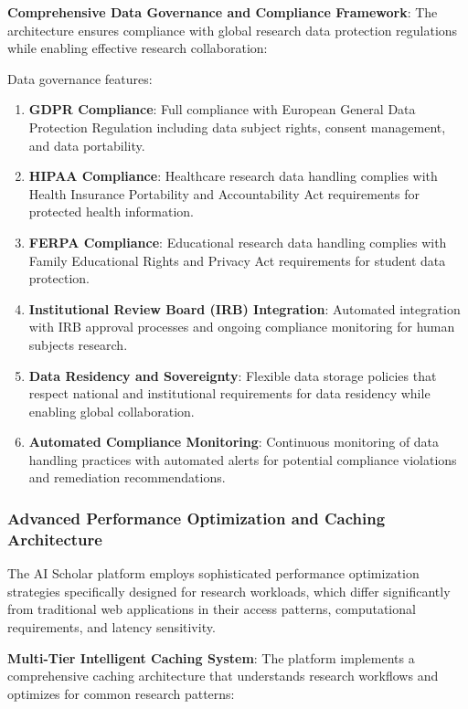 \documentclass[10pt,twocolumn]{article}
\begin{document}
\textbf{Comprehensive Data Governance and Compliance Framework}: The architecture ensures compliance with global research data protection regulations while enabling effective research collaboration:

Data governance features:
\begin{enumerate}
    \item \textbf{GDPR Compliance}: Full compliance with European General Data Protection Regulation including data subject rights, consent management, and data portability.
    
    \item \textbf{HIPAA Compliance}: Healthcare research data handling complies with Health Insurance Portability and Accountability Act requirements for protected health information.
    
    \item \textbf{FERPA Compliance}: Educational research data handling complies with Family Educational Rights and Privacy Act requirements for student data protection.
    
    \item \textbf{Institutional Review Board (IRB) Integration}: Automated integration with IRB approval processes and ongoing compliance monitoring for human subjects research.
    
    \item \textbf{Data Residency and Sovereignty}: Flexible data storage policies that respect national and institutional requirements for data residency while enabling global collaboration.
    
    \item \textbf{Automated Compliance Monitoring}: Continuous monitoring of data handling practices with automated alerts for potential compliance violations and remediation recommendations.
\end{enumerate}

\subsubsection{Advanced Performance Optimization and Caching Architecture}

The AI Scholar platform employs sophisticated performance optimization strategies specifically designed for research workloads, which differ significantly from traditional web applications in their access patterns, computational requirements, and latency sensitivity.

\textbf{Multi-Tier Intelligent Caching System}: The platform implements a comprehensive caching architecture that understands research workflows and optimizes for common research patterns:
\end{document}
